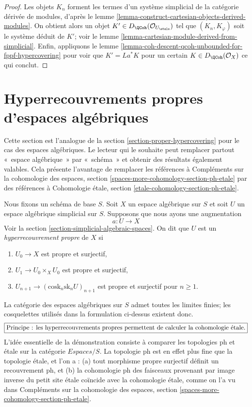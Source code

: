 \begin{proof}
Les objets $K_n$ forment les termes d'un système simplicial de la
catégorie dérivée de modules, d'après le
lemme \ref{lemma-construct-cartesian-objects-derived-modules}.
On obtient alors un objet
$K' \in D_\QCoh(\mathcal{O}_{U_\etale})$
tel que $(K_n, K_\varphi)$ soit le système déduit de $K'$; voir le lemme
\ref{lemma-cartesian-module-derived-from-simplicial}.
Enfin, appliquons le lemme
\ref{lemma-coh-descent-qcoh-unbounded-for-fppf-hypercovering}
pour voir que $K' = La^*K$ pour un certain $K \in D_\QCoh(\mathcal{O}_X)$
ce qui conclut.
\end{proof}











\section{Hyperrecouvrements propres d'espaces algébriques}
\label{section-proper-hypercovering-spaces}

\noindent
Cette section est l'analogue de la section \ref{section-proper-hypercovering}
pour le cas des espaces algébriques.
Le lecteur qui le souhaite peut remplacer partout « espace algébrique »
par « schéma » et obtenir des résultats également valables.
Cela présente l'avantage de remplacer les références à
Compléments sur la cohomologie des espaces, section
\ref{spaces-more-cohomology-section-ph-etale}
par des références à
Cohomologie étale, section \ref{etale-cohomology-section-ph-etale}.

\medskip\noindent
Nous fixons un schéma de base $S$.
Soit $X$ un espace algébrique sur $S$ et soit $U$ un espace algébrique simplicial
sur $S$. Supposons que nous ayons une augmentation
$$
a : U \to X
$$
Voir la section \ref{section-simplicial-algebraic-spaces}.
On dit que $U$ est un {\it hyperrecouvrement propre} de $X$ si
\begin{enumerate}
\item $U_0 \to X$ est propre et surjectif,
\item $U_1 \to U_0 \times_X U_0$ est propre et surjectif,
\item $U_{n + 1} \to (\text{cosk}_n\text{sk}_n U)_{n + 1}$
est propre et surjectif pour $n \geq 1$.
\end{enumerate}
La catégorie des espaces algébriques sur $S$ admet toutes les limites finies; les cosquelettes
utilisés dans la formulation ci-dessus existent donc.
$$
\fbox{Principe : les hyperrecouvrements propres permettent de
calculer la cohomologie étale.}
$$
L'idée essentielle de la démonstration consiste à comparer les topologies
ph et \'etale sur la catégorie $\textit{Espaces}/S$.
La topologie ph est en effet plus fine que la topologie \'etale, et l'on a :
(a) tout morphisme propre surjectif définit un recouvrement ph, et
(b) la cohomologie ph des faisceaux provenant par image inverse du petit site étale
coïncide avec la cohomologie étale, comme on l'a vu dans
Compléments sur la cohomologie des espaces, section
\ref{spaces-more-cohomology-section-ph-etale}.

